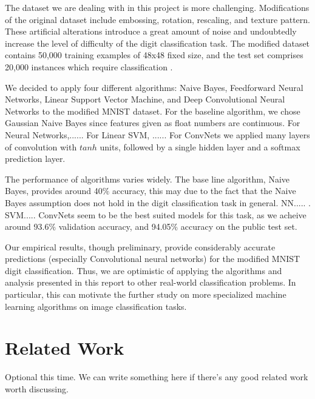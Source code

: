 \documentclass{acm_proc_article-sp}
\begin{document}
The dataset we are dealing with in this project is more challenging. Modifications of the original dataset include embossing, rotation, rescaling, and texture pattern. These artificial alterations introduce a great amount of noise and undoubtedly increase the  level of difficulty of the digit classification task. The modified dataset contains 50,000 training examples of 48x48 fixed size, and the test set comprises 20,000 instances which require classification \cite{comp598p3}.

We decided to apply four different algorithms: Naive Bayes, Feedforward Neural Networks, Linear Support Vector Machine, and Deep Convolutional Neural Networks to the modified MNIST dataset. For the baseline algorithm, we chose Gaussian Naive Bayes since features given as float numbers are continuous.  For Neural Networks,......  For Linear SVM, ......  For ConvNets we applied many layers of convolution with $tanh$ units, followed by a single hidden layer and a softmax prediction layer.

The performance of algorithms varies widely. The base line algorithm, Naive Bayes, provides around 40$\%$ accuracy, this may due to the fact that the Naive Bayes assumption does not hold in the digit classification task in general. NN..... . SVM..... ConvNets seem to be the best suited models for this task, as we acheive around 93.6$\%$ validation accuracy, and 94.05$\%$ accuracy on the public test set.

Our empirical results, though preliminary, provide considerably accurate predictions (especially Convolutional neural networks) for the modified MNIST digit classification. Thus, we are optimistic of applying the algorithms and analysis presented in this report to other real-world  classification problems. In particular, this can motivate the further study on more specialized machine learning algorithms on image classification tasks.




\section{Related Work}
Optional this time. We can write something here if there's any good related work worth discussing.
\end{document}
